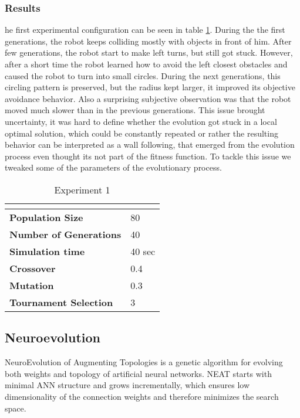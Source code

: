 \documentclass[format=acmsmall, review=false, screen=true]{acmart}
\begin{document}
\subsubsection{Results}

he first experimental configuration can be seen in table \ref{fig:experiment_1}. During the the first generations, the robot keeps colliding mostly with objects in front of him. After few generations, the robot start to make left turns, but still got stuck. However, after a short time the robot learned how to avoid the left closest obstacles and caused the robot to turn into small circles. During the next generations, this circling pattern is preserved, but the radius kept larger, it improved its objective avoidance behavior. Also a surprising  subjective observation was that the robot moved much slower than in the previous generations. This issue brought uncertainty, it was hard to define whether the evolution got stuck in a local optimal solution, which could be constantly repeated or rather the resulting behavior can be interpreted as a wall following, that emerged from the evolution process even thought its not part of the fitness function. To tackle this issue we tweaked some of the parameters of the evolutionary process.

\begin{table}[H]
\begin{tabular}{ll}
\hline
\textbf{}                      & \textbf{} \\ \hline
\textbf{Population Size}       & 80        \\
\textbf{Number of Generations} & 40        \\
\textbf{Simulation time}       & 40 sec    \\
\textbf{Crossover}             & 0.4       \\
\textbf{Mutation}              & 0.3       \\
\textbf{Tournament Selection}  & 3        
\end{tabular}
\caption{Experiment 1}
\label{fig:experiment_1}
\end{table}

\subsection{Neuroevolution}

NeuroEvolution of Augmenting Topologies \cite{stanley2002evolving} is a genetic algorithm for evolving both weights and topology of artificial neural networks. NEAT starts with minimal ANN structure and grows incrementally, which ensures low dimensionality of the connection weights and therefore minimizes the search space.
\end{document}
